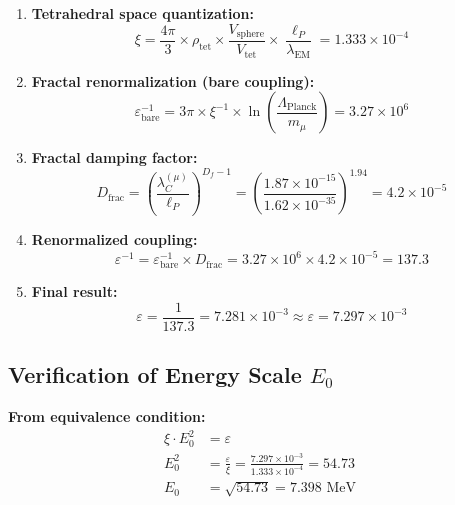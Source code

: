 \documentclass[12pt,a4paper]{article}
\numberwithin{equation}{section}
\newcommand{\xipar}{\xi}
\newcommand{\epsilonT}{\varepsilon}
\newcommand{\Df}{D_f}
\newcommand{\Eo}{E_0}
\newcommand{\lP}{\ell_P}
\newcommand{\lambdaC}{\lambda_C}
\newcommand{\lambdaEM}{\lambda_{\text{EM}}}
\begin{document}
	\begin{enumerate}
		\item \textbf{Tetrahedral space quantization:}
		\begin{equation}
			\xipar = \frac{4\pi}{3} \times \rho_{\text{tet}} \times \frac{V_{\text{sphere}}}{V_{\text{tet}}} \times \frac{\lP}{\lambdaEM} = 1.333 \times 10^{-4}
			\label{eq:xi_step1}
		\end{equation}
		
		\item \textbf{Fractal renormalization (bare coupling):}
		\begin{equation}
			\epsilonT^{-1}_{\text{bare}} = 3\pi \times \xipar^{-1} \times \ln\left(\frac{\Lambda_{\text{Planck}}}{m_\mu}\right) = 3.27 \times 10^6
			\label{eq:epsilon_step2}
		\end{equation}
		
		\item \textbf{Fractal damping factor:}
		\begin{equation}
			D_{\text{frac}} = \left(\frac{\lambdaC^{(\mu)}}{\lP}\right)^{\Df-1} = \left(\frac{1.87 \times 10^{-15}}{1.62 \times 10^{-35}}\right)^{1.94} = 4.2 \times 10^{-5}
			\label{eq:epsilon_step3}
		\end{equation}
		
		\item \textbf{Renormalized coupling:}
		\begin{equation}
			\epsilonT^{-1} = \epsilonT^{-1}_{\text{bare}} \times D_{\text{frac}} = 3.27 \times 10^6 \times 4.2 \times 10^{-5} = 137.3
			\label{eq:epsilon_step4}
		\end{equation}
		
		\item \textbf{Final result:}
		\begin{equation}
			\epsilonT = \frac{1}{137.3} = 7.281 \times 10^{-3} \approx  \epsilonT = 7.297 \times 10^{-3}
			\label{eq:epsilon_step5}
		\end{equation}
	\end{enumerate}
	
	\subsection{Verification of Energy Scale $\Eo$}
	
	\textbf{From equivalence condition:}
	\begin{align}
		\xipar \cdot \Eo^2 &= \epsilonT\\
		\Eo^2 &= \frac{\epsilonT}{\xipar} = \frac{7.297 \times 10^{-3}}{1.333 \times 10^{-4}} = 54.73\\
		\Eo &= \sqrt{54.73} = 7.398 \text{ MeV}
		\label{eq:e0_verification}
	\end{align}
	
\end{document}
